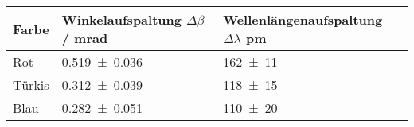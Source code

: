 \begin{tabular}{lll}
	\toprule
	Farbe & Winkelaufspaltung $\Delta\beta$ / \si{\milli\radian} & Wellenlängenaufspaltung $\Delta\lambda$ \si{\pico\metre}  \\
	\midrule
	Rot  &	\num{0.519+-0.036} &	\num{162+-11} \\
	Türkis  &	\num{0.312+-0.039} &	\num{118+-15} \\
	Blau  &	\num{0.282+-0.051} &	\num{110+-20} \\
	\bottomrule
\end{tabular}